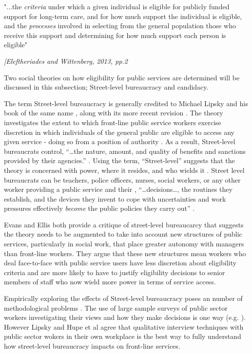 \documentclass[12pt,]{report}
\begin{document}
\epigraph{"...the \emph{criteria} under which a given individual is eligible for publicly funded support for long-term care, and for how much support the individual is eligible, and the \emph{processes} involved in selecting from the general population those who receive this support and determining for how much support each person is eligible"}{\textit{[Eleftheriades and Wittenberg, 2013, pp.2}}

Two social theories on how eligibility for public services are
determined will be discussed in this subsection; Street-level
bureaucracy and candidacy.

The term Street-level bureaucracy is generally credited to Michael
Lipsky and his book of the same name \citeyearpar{RN174}, along with its
more recent revision \citep{RN430}. The theory investigates the extent
to which front-line public service workers exercise discretion in which
individuals of the general public are eligible to access any given
service - doing so from a position of authority \citep{RN430}. As a
result, Street-level bureaucrats control, ``\ldots{}the nature, amount,
and quality of benefits and sanctions provided by their agencies.''
\citep[pp.13]{RN430}. Using the term, ``Street-level'' suggests that the
theory is concerned with power, where it resides, and who wields it
\citep{RN428}. Street level bureaucrats can be teachers, police
officers, nurses, social workers, or any other worker providing a public
service \citep{RN428} and their , ``\ldots{}decisions\ldots{}, the
routines they establish, and the devices they invent to cope with
uncertainties and work pressures effectively \emph{become} the public
policies they carry out'' \citep[pp.xiii]{RN430}.

Evans\citeyearpar{RN424} and Ellis \citeyearpar{RN426} both provide a
critique of street-level bureaucarcy that suggests the theory needs to
be augmented to take into account new structures of public services,
particularly in social work, that place greater autonomy with managers
than front-line workers. They argue that these new structures mean
workers who deal face-to-face with public service users have less
discretion about eligibility criteria and are more likely to have to
justify eligibility decisions to senior members of staff who now wield
more power in terms of service access.

Empirically exploring the effects of Street-level bureaucracy poses an
number of methodological problems \citep{RN428}. The use of large sample
surveys of public sector workers investigating their views and how they
make decisions is one way (e.g. \citep{RN427}). However Lipsky
\citeyearpar{RN430} and Hupe et al \citeyearpar{RN428} agree that
qualitative interview techniques with public sector wokers in their own
workplace is the best way to fully understand how street-level
bureaucracy impacts on front-line services.
\end{document}
